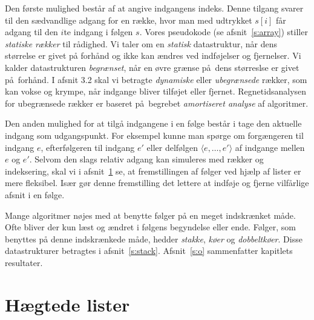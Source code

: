 Den første mulighed består af at angive indgangens indeks.
Denne tilgang svarer til den sædvandlige adgang for en række,
hvor man med udtrykket $s[i]$ får adgang til den $i$te indgang i følgen $s$.
Vores pseudokode (se afsnit~\ref{s:array}) stiller \emph{statiske rækker} til rådighed.
Vi taler om en \emph{statisk} datastruktur, når dens størrelse er givet på forhånd og ikke kan ændres ved indføjelser og fjernelser.
Vi kalder datastrukturen \emph{begrænset},
  når en øvre grænse på dens størreslse er givet på forhånd.
I afsnit 3.2 skal vi betragte \emph{dynamiske} eller \emph{ubegrænsede} rækker,
som kan vokse og krympe, når indgange bliver tilføjet eller fjernet.
Regnetidsanalysen for ubegrænsede rækker er baseret på begrebet \emph{amortiseret analyse} af algoritmer.

Den anden mulighed for at tilgå indgangene i en følge består i tage den aktuelle indgang som udgangspunkt.
For eksempel kunne man spørge om forgængeren til indgang $e$,
efterfølgeren til indgang $e'$ 
eller delfølgen $\langle e,\ldots, e'\rangle$ af indgange mellen $e$ og $e'$.
Selvom den slags relativ adgang kan simuleres med rækker og indeksering, skal vi i afsnit~\ref{s:list} se, at fremstillingen af følger ved hjælp af lister er mere fleksibel.
Især gør denne fremstilling det lettere at indføje
og fjerne
vilfårlige afsnit i en følge.

Mange algoritmer nøjes med at benytte følger på en meget indskrænket måde.
Ofte bliver der kun læst og ændret i følgens begyndelse eller ende.
Følger, som benyttes på denne indskrænkede måde, hedder \emph{stakke}, \emph{køer} og \emph{dobbeltkøer}.
Disse datastrukturer betragtes i afsnit~\ref{s:stack}.
Afsnit~\ref{s:o} sammenfatter kapitlets resultater.

\section{Hægtede lister}
\label{s:list}


\newcommand{\friListe}{\Id{friListe}}


